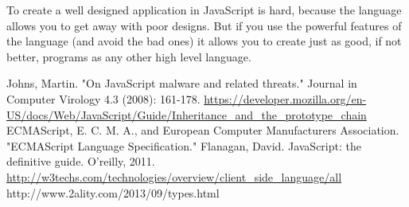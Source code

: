 \documentclass{report}
\begin{document}
To create a well designed application in JavaScript is hard, because the language allows you to get away with poor designs. But if you use the powerful features of the language (and avoid the bad ones) it allows you to create just as good, if not better, programs as any other high level language.
\begin{thebibliography}{99}
Johns, Martin. "On JavaScript malware and related threats." Journal in Computer Virology 4.3 (2008): 161-178.
\url{https://developer.mozilla.org/en-US/docs/Web/JavaScript/Guide/Inheritance\_and\_the\_prototype\_chain}
ECMAScript, E. C. M. A., and European Computer Manufacturers Association. "ECMAScript Language Specification."
Flanagan, David. JavaScript: the definitive guide. O'reilly, 2011.
\url{http://w3techs.com/technologies/overview/client_side_language/all}
http://www.2ality.com/2013/09/types.html
\end{thebibliography}
\end{document}
